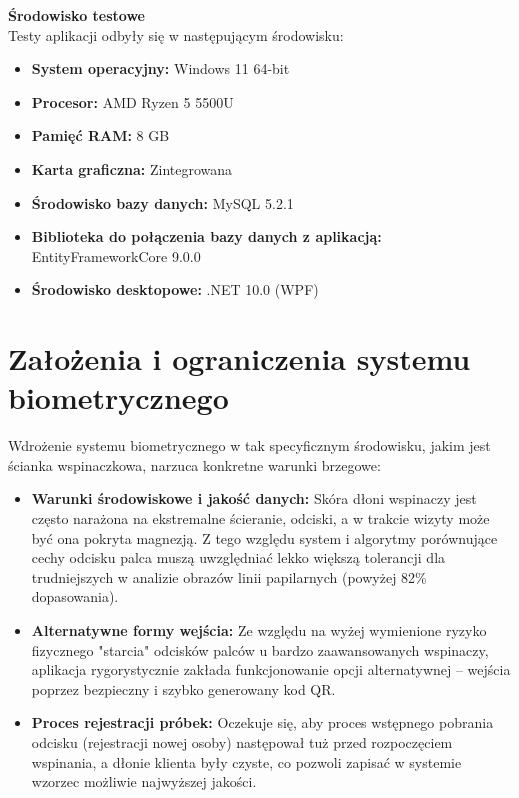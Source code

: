 \textbf{Środowisko testowe} \\
Testy aplikacji odbyły się w następującym środowisku:
\begin{itemize}
    \item \textbf{System operacyjny:} Windows 11 64-bit
    \item \textbf{Procesor:} AMD Ryzen 5 5500U
    \item \textbf{Pamięć RAM:} 8 GB
    \item \textbf{Karta graficzna:} Zintegrowana
    \item \textbf{Środowisko bazy danych:} MySQL 5.2.1
    \item \textbf{Biblioteka do połączenia bazy danych z aplikacją:} EntityFrameworkCore 9.0.0
    \item \textbf{Środowisko desktopowe:} .NET 10.0 (WPF)
\end{itemize}

\section{Założenia i ograniczenia systemu biometrycznego}
\label{sec:zalozeniaBiometryczne}

Wdrożenie systemu biometrycznego w tak specyficznym środowisku, jakim jest ścianka wspinaczkowa, narzuca konkretne warunki brzegowe:
\begin{itemize}
    \item \textbf{Warunki środowiskowe i jakość danych:} Skóra dłoni wspinaczy jest często narażona na ekstremalne ścieranie, odciski, a w trakcie wizyty może być ona pokryta magnezją. Z tego względu system i algorytmy porównujące cechy odcisku palca muszą uwzględniać lekko większą tolerancji dla trudniejszych w analizie obrazów linii papilarnych (powyżej 82\% dopasowania).
    \item \textbf{Alternatywne formy wejścia:} Ze względu na wyżej wymienione ryzyko fizycznego "starcia" odcisków palców u bardzo zaawansowanych wspinaczy, aplikacja rygorystycznie zakłada funkcjonowanie opcji alternatywnej -- wejścia poprzez bezpieczny i szybko generowany kod QR.
    \item \textbf{Proces rejestracji próbek:} Oczekuje się, aby proces wstępnego pobrania odcisku (rejestracji nowej osoby) następował tuż przed rozpoczęciem wspinania, a dłonie klienta były czyste, co pozwoli zapisać w systemie wzorzec możliwie najwyższej jakości.
\end{itemize}
